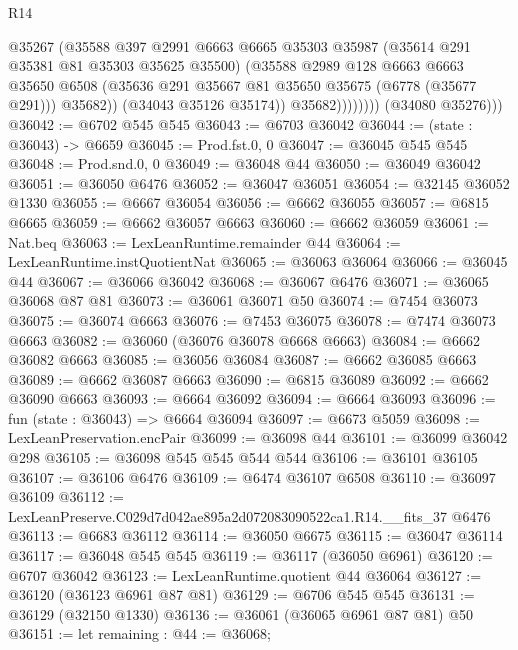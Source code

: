 \begin{lexlean}{R14}
\begin{coremodule}
                          @35267
                          (@35588
                            @397
                            @2991
                            @6663
                            @6665
                            @35303
                            @35987
                            (@35614 @291 @35381 @81 @35303 @35625 @35500)
                            (@35588
                              @2989
                              @128
                              @6663
                              @6663
                              @35650
                              @6508
                              (@35636 @291 @35667 @81 @35650 @35675 (@6778 (@35677 @291)))
                              @35682))
                          (@34043 @35126 @35174))
                        @35682))))))))
        (@34080 @35276)))
@36042 := @6702 @545 @545
@36043 := @6703 @36042
@36044 := (state : @36043) -> @6659
@36045 := Prod.fst.{0, 0}
@36047 := @36045 @545 @545
@36048 := Prod.snd.{0, 0}
@36049 := @36048 @44
@36050 := @36049 @36042
@36051 := @36050 @6476
@36052 := @36047 @36051
@36054 := @32145 @36052 @1330
@36055 := @6667 @36054
@36056 := @6662 @36055
@36057 := @6815 @6665
@36059 := @6662 @36057 @6663
@36060 := @6662 @36059
@36061 := Nat.beq
@36063 := LexLeanRuntime.remainder @44
@36064 := LexLeanRuntime.instQuotientNat
@36065 := @36063 @36064
@36066 := @36045 @44
@36067 := @36066 @36042
@36068 := @36067 @6476
@36071 := @36065 @36068 @87 @81
@36073 := @36061 @36071 @50
@36074 := @7454 @36073
@36075 := @36074 @6663
@36076 := @7453 @36075
@36078 := @7474 @36073 @6663
@36082 := @36060 (@36076 @36078 @6668 @6663)
@36084 := @6662 @36082 @6663
@36085 := @36056 @36084
@36087 := @6662 @36085 @6663
@36089 := @6662 @36087 @6663
@36090 := @6815 @36089
@36092 := @6662 @36090 @6663
@36093 := @6664 @36092
@36094 := @6664 @36093
@36096 := fun (state : @36043) => @6664 @36094
@36097 := @6673 @5059
@36098 := LexLeanPreservation.encPair
@36099 := @36098 @44
@36101 := @36099 @36042 @298
@36105 := @36098 @545 @545 @544 @544
@36106 := @36101 @36105
@36107 := @36106 @6476
@36109 := @6474 @36107 @6508
@36110 := @36097 @36109
@36112 := LexLeanPreserve.C029d7d042ae895a2d072083090522ca1.R14.__fits_37 @6476
@36113 := @6683 @36112
@36114 := @36050 @6675
@36115 := @36047 @36114
@36117 := @36048 @545 @545
@36119 := @36117 (@36050 @6961)
@36120 := @6707 @36042
@36123 := LexLeanRuntime.quotient @44 @36064
@36127 := @36120 (@36123 @6961 @87 @81)
@36129 := @6706 @545 @545
@36131 := @36129 (@32150 @1330)
@36136 := @36061 (@36065 @6961 @87 @81) @50
@36151 := let remaining : @44 := @36068;

\end{coremodule}
\end{lexlean}

